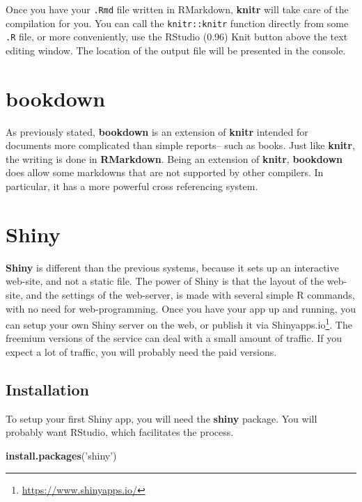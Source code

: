 \documentclass[]{book}
\newenvironment{Shaded}{\begin{snugshade}}{\end{snugshade}}
\newcommand{\KeywordTok}[1]{\textcolor[rgb]{0.13,0.29,0.53}{\textbf{#1}}}
\newcommand{\NormalTok}[1]{#1}
\newcommand{\StringTok}[1]{\textcolor[rgb]{0.31,0.60,0.02}{#1}}
\renewcommand{\href}[2]{#2\footnote{\url{#1}}}
\theoremstyle{definition}
\theoremstyle{definition}
\theoremstyle{definition}
\theoremstyle{remark}
\begin{document}
Once you have your \texttt{.Rmd} file written in RMarkdown, \textbf{knitr} will take care of the compilation for you.
You can call the \texttt{knitr::knitr} function directly from some \texttt{.R} file, or more conveniently, use the RStudio (0.96) Knit button above the text editing window.
The location of the output file will be presented in the console.

\hypertarget{bookdown}{%
\section{bookdown}\label{bookdown}}

As previously stated, \textbf{bookdown} is an extension of \textbf{knitr} intended for documents more complicated than simple reports-- such as books.
Just like \textbf{knitr}, the writing is done in \textbf{RMarkdown}.
Being an extension of \textbf{knitr}, \textbf{bookdown} does allow some markdowns that are not supported by other compilers.
In particular, it has a more powerful cross referencing system.

\hypertarget{shiny}{%
\section{Shiny}\label{shiny}}

\textbf{Shiny} \citep{shiny} is different than the previous systems, because it sets up an interactive web-site, and not a static file.
The power of Shiny is that the layout of the web-site, and the settings of the web-server, is made with several simple R commands, with no need for web-programming.
Once you have your app up and running, you can setup your own Shiny server on the web, or publish it via \href{https://www.shinyapps.io/}{Shinyapps.io}.
The freemium versions of the service can deal with a small amount of traffic. If you expect a lot of traffic, you will probably need the paid versions.

\hypertarget{installation-1}{%
\subsection{Installation}\label{installation-1}}

To setup your first Shiny app, you will need the \textbf{shiny} package.
You will probably want RStudio, which facilitates the process.

\begin{Shaded}
\begin{Highlighting}[]
\KeywordTok{install.packages}\NormalTok{(}\StringTok{'shiny'}\NormalTok{)}
\end{Highlighting}
\end{Shaded}
\end{document}
